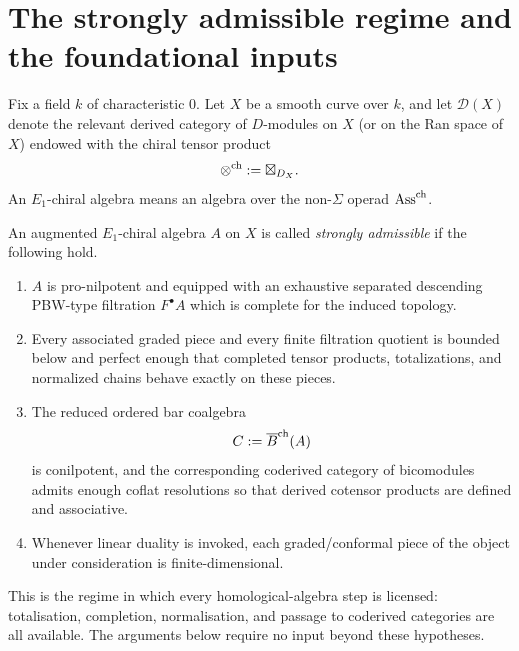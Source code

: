 \section{The strongly admissible regime and the foundational inputs}
\label{sec:setup}

Fix a field $k$ of characteristic $0$. Let $X$ be a smooth curve over
$k$, and let $\mathcal D(X)$ denote the relevant derived category of
$D$-modules on $X$ (or on the Ran space of $X$) endowed with the
chiral tensor product
\[
\mathbin{\otimes^{\mathrm{ch}}} := \boxtimes_{D_X}.
\]
An $E_1$-chiral algebra means an algebra over the non-$\Sigma$ operad $\mathrm{Ass}^{\mathrm{ch}}$.

\begin{definition}
An augmented $E_1$-chiral algebra $A$ on $X$ is called \emph{strongly admissible} if the following
hold.
\begin{enumerate}[label=(\alph*)]
\item $A$ is pro-nilpotent and equipped with an exhaustive separated descending PBW-type filtration
$F^\bullet A$ which is complete for the induced topology.

\item Every associated graded piece and every finite filtration quotient is bounded below and perfect
enough that completed tensor products, totalizations, and normalized chains behave exact\-ly on these
pieces.

\item The reduced ordered bar coalgebra
\[
C:=\overline{B}^{\mathrm{ch}}(A)
\]
is conilpotent, and the corresponding coderived category of bicomodules admits enough coflat
resolutions so that derived cotensor products are defined and associative.

\item Whenever linear duality is invoked, each graded/conformal piece of the object under consideration
is finite-dimensional.
\end{enumerate}
\end{definition}

\begin{remark}
This is the regime in which every homological-algebra step is
licensed: totalisation, completion, normalisation, and passage to
coderived categories are all available. The arguments below require
no input beyond these hypotheses.
\end{remark}


